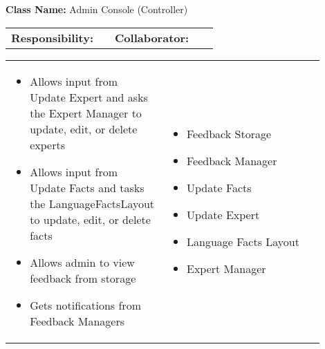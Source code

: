 \begin{red_cards}[]
    \textbf{Class Name:} Admin Console (Controller)
    \tcbline
    \begin{tabular}{p{0.45\linewidth} | p{0.45\linewidth}}
        \textbf{Responsibility:}& 
        \textbf{Collaborator:}\\
    \end{tabular}
    \tcbline
    \begin{tabular}{p{0.45\linewidth} | p{0.45\linewidth}}
        \begin{itemize}

            \item Allows input from Update Expert and asks the Expert Manager to update, edit, or delete experts
            \item Allows input from Update Facts and tasks the LanguageFactsLayout to update, edit, or delete facts
            \item Allows admin to view feedback from storage
            \item Gets notifications from Feedback Managers
        \end{itemize}
        &
        \begin{itemize}
            \item Feedback Storage
            \item Feedback Manager
            \item Update Facts
            \item Update Expert
            \item Language Facts Layout
            \item Expert Manager
        \end{itemize}
    \end{tabular}
\end{red_cards}